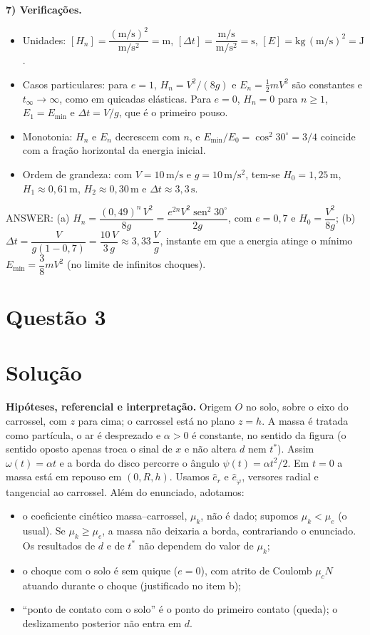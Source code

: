 \documentclass{article}%
\begin{document}
\textbf{7) Verificações.}
\begin{itemize}
\item Unidades: $[H_n] = \dfrac{(\mathrm{m/s})^2}{\mathrm{m/s^2}} = \mathrm{m}$, $[\Delta t] = \dfrac{\mathrm{m/s}}{\mathrm{m/s^2}} = \mathrm{s}$, $[E] = \mathrm{kg\,(m/s)^2} = \mathrm{J}$.
\item Casos particulares: para $e=1$, $H_n = V^2/(8g)$ e $E_n = \frac{1}{2}mV^2$ são constantes e $t_\infty\to\infty$, como em quicadas elásticas. Para $e=0$, $H_n=0$ para $n\ge 1$, $E_1 = E_{\min}$ e $\Delta t = V/g$, que é o primeiro pouso.
\item Monotonia: $H_n$ e $E_n$ decrescem com $n$, e $E_{\min}/E_0 = \cos^2 30^\circ = 3/4$ coincide com a fração horizontal da energia inicial.
\item Ordem de grandeza: com $V=10\,\mathrm{m/s}$ e $g=10\,\mathrm{m/s^2}$, tem-se $H_0 = 1{,}25\,\mathrm{m}$, $H_1 \approx 0{,}61\,\mathrm{m}$, $H_2 \approx 0{,}30\,\mathrm{m}$ e $\Delta t \approx 3{,}3\,\mathrm{s}$.
\end{itemize}

ANSWER: (a) $H_n = \dfrac{(0{,}49)^{n}\,V^2}{8g} = \dfrac{e^{2n}V^2\operatorname{sen}^2 30^\circ}{2g}$, com $e=0{,}7$ e $H_0 = \dfrac{V^2}{8g}$; (b) $\Delta t = \dfrac{V}{g(1-0{,}7)} = \dfrac{10\,V}{3\,g}\approx 3{,}33\,\dfrac{V}{g}$, instante em que a energia atinge o mínimo $E_{\min} = \dfrac{3}{8}mV^2$ (no limite de infinitos choques).%
\newpage%
\section*{Questão 3}

\section*{Solução}

\textbf{Hipóteses, referencial e interpretação.} Origem $O$ no solo, sobre o eixo do carrossel, com $z$ para cima; o carrossel está no plano $z=h$. A massa é tratada como partícula, o ar é desprezado e $\alpha>0$ é constante, no sentido da figura (o sentido oposto apenas troca o sinal de $x$ e não altera $d$ nem $t^\ast$). Assim $\omega(t)=\alpha t$ e a borda do disco percorre o ângulo $\psi(t)=\alpha t^2/2$. Em $t=0$ a massa está em repouso em $(0,R,h)$. Usamos $\hat e_r$ e $\hat e_\varphi$, versores radial e tangencial ao carrossel. Além do enunciado, adotamos:
\begin{itemize}
\item o coeficiente cinético massa–carrossel, $\mu_k$, não é dado; supomos $\mu_k<\mu_e$ (o usual). Se $\mu_k\ge\mu_e$, a massa não deixaria a borda, contrariando o enunciado. Os resultados de $d$ e de $t^\ast$ não dependem do valor de $\mu_k$;
\item o choque com o solo é sem quique ($e=0$), com atrito de Coulomb $\mu_cN$ atuando durante o choque (justificado no item b);
\item ``ponto de contato com o solo'' é o ponto do primeiro contato (queda); o deslizamento posterior não entra em $d$.
\end{itemize}
\end{document}
